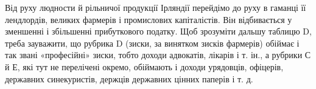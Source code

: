 Від руху людности й рільничої продукції Ірляндії перейдімо
до руху в гаманці її лендлордів, великих фармерів і промислових
капіталістів. Він відбивається у зменшенні і збільшенні прибуткового
податку. Щоб зрозуміти дальшу таблицю D, треба зауважити,
що рубрика D (зиски, за винятком зисків фармерів) обіймає
і так звані «професійні» зиски, тобто доходи адвокатів,
лікарів і т. ін., а рубрики С й Е, які тут не перелічені окремо,
обіймають і доходи урядовців, офіцерів, державних синекуристів,
держців державних цінних паперів і т. д.
